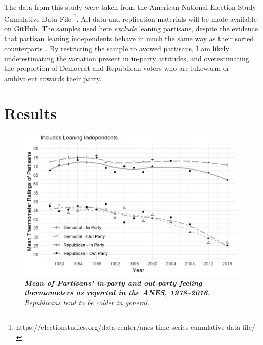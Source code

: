 \documentclass[12pt]{paper}
\begin{document}
The data from this study were taken from the American National Election Study Cumulative Data File \footnote{https://electionstudies.org/data-center/anes-time-series-cumulative-data-file/}. All data and replication materials will be made available on GitHub. The samples used here \textit{exclude} leaning partisans, despite the evidence that partisan leaning independents behave in much the same way as their sorted counterparts \citep{klar2016independent}. By restricting the sample to avowed partisans, I am likely underestimating the variation present in in-party attitudes, and overestimating the proportion of Democrat and Republican voters who are lukewarm or ambivalent towards their party. 

\section{Results}

\begin{figure}[H]
\center\includegraphics[width=5in]{cdf-mean-ns.png}
\caption{\label{fig:cdf-mean} \textit{\textbf{Mean of Partisans' in-party and out-party feeling thermometers as reported in the ANES, 1978--2016.} Republicans tend to be colder in general.}}
\end{figure}
\end{document}
